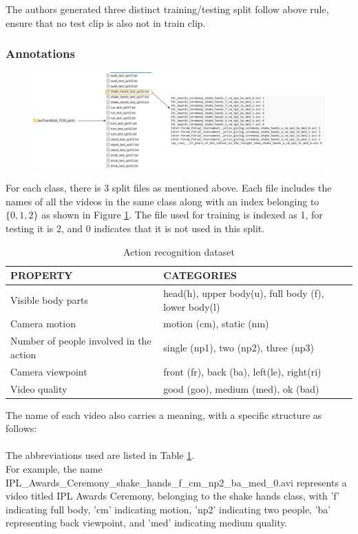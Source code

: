 \documentclass[10pt,onecolumn,letterpaper]{article}
\begin{document}
The authors generated three distinct training/testing split follow above rule,
ensure that no test clip is also not in train clip.

\subsubsection{\textbf{Annotations}}

\begin{figure}[h]
	\centering
	\includegraphics[width=1.\linewidth]{"fig_info/fig2/Untitled Diagram.drawio"}
	\caption{}
	\label{fig:untitled-diagram}
\end{figure}

For each class, there is 3 split files as mentioned above. Each file
includes the names of all the videos in the same class along with an index
belonging to $\lbrace 0, 1, 2 \rbrace$ as shown in Figure
\ref{fig:untitled-diagram}. The file used for training is indexed as 1, for
testing it is 2, and 0 indicates that it is not used in this split.

\begin{table}[h]
	\centering
	\caption{Action recognition dataset}
	\begin{tabular}{l | l     }
		\toprule
		PROPERTY & CATEGORIES \\
		\midrule
		Visible body parts & head(h), upper body(u), full body (f), lower body(l)\\ 
		Camera motion & motion (cm), static (nm) \\
		Number of people involved in the action	& single (np1), two (np2), three
		(np3)\\
		Camera viewpoint & front (fr), back (ba), left(le), right(ri) \\
		Video quality & good (goo), medium (med), ok (bad)	\\
		
		
		\bottomrule
	\end{tabular}%
	\label{config2}
\end{table}%

The name of each video also carries a meaning, with a specific structure as
follows: \\
\\
The abbreviations used are listed in Table \ref{config2}. \\
For example, the name
IPL\_Awards\_Ceremony\_shake\_hands\_f\_cm\_np2\_ba\_med\_0.avi represents a
video titled IPL Awards Ceremony, belonging to the shake hands class, with 'f'
indicating full body, 'cm' indicating motion, 'np2' indicating two people, 'ba'
representing back viewpoint, and 'med' indicating medium quality.
\end{document}
